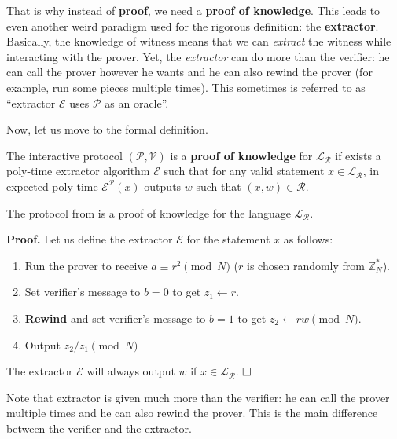 \documentclass[../lecture-notes.tex]{subfiles}
\begin{document}
That is why instead of \textbf{proof}, we need a \textbf{proof of knowledge}. This leads to even another weird paradigm used for the rigorous definition: the \textbf{extractor}. Basically, the knowledge of witness means that we can \textit{extract} the witness while interacting with the prover. Yet, the \textit{extractor} can do more than the verifier: he can call the prover however he wants and he can also rewind the prover (for example, run some pieces multiple times). This sometimes is referred to as ``extractor $\mathcal{E}$ uses $\mathcal{P}$ as an oracle''. 

Now, let us move to the formal definition.

\begin{definition}
    The interactive protocol $(\mathcal{P}, \mathcal{V})$ is a \textbf{proof of knowledge} for $\mathcal{L}_{\mathcal{R}}$ if exists a poly-time extractor algorithm $\mathcal{E}$ such that for any valid statement $x \in \mathcal{L}_{\mathcal{R}}$, in expected poly-time $\mathcal{E}^{\mathcal{P}}(x)$ outputs $w$ such that $(x,w) \in \mathcal{R}$.
\end{definition}

\begin{lemma}
    The protocol from  is a proof of knowledge for the language $\mathcal{L}_{\mathcal{R}}$. 
\end{lemma}

\textbf{Proof.} Let us define the extractor $\mathcal{E}$ for the statement $x$ as follows:
\begin{enumerate}
    \item Run the prover to receive $a \equiv r^2 \pmod{N}$ ($r$ is chosen randomly from $\mathbb{Z}_N^*$).
    \item Set verifier's message to $b=0$ to get $z_1 \gets r$.
    \item \textbf{Rewind} and set verifier's message to $b=1$ to get $z_2 \gets rw \pmod{N}$.
    \item Output $z_2/z_1 \pmod{N}$
\end{enumerate}

The extractor $\mathcal{E}$ will always output $w$ if $x \in \mathcal{L}_{\mathcal{R}}$. $\hfill\Box$

\begin{remark}
    Note that extractor is given much more than the verifier: he can call the prover multiple times and he can also rewind the prover. This is the main difference between the verifier and the extractor.    
\end{remark}
\end{document}
